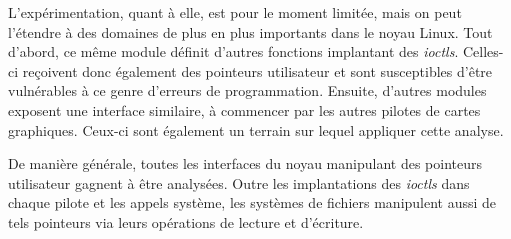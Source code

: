 L'expérimentation, quant à elle, est pour le moment limitée, mais on peut
l'étendre à des domaines de plus en plus importants dans le noyau Linux. Tout
d'abord, ce même module définit d'autres fonctions implantant des \emph{ioctls}.
Celles-ci reçoivent donc également des pointeurs utilisateur et sont
susceptibles d'être vulnérables à ce genre d'erreurs de programmation. Ensuite,
d'autres modules exposent une interface similaire, à commencer par les autres
pilotes de cartes graphiques. Ceux-ci sont également un terrain sur lequel
appliquer cette analyse.


De manière générale, toutes les interfaces du noyau manipulant des pointeurs
utilisateur gagnent à être analysées. Outre les implantations des \emph{ioctls}
dans chaque pilote et les appels système, les systèmes de fichiers manipulent
aussi de tels pointeurs via leurs opérations de lecture et d'écriture.

